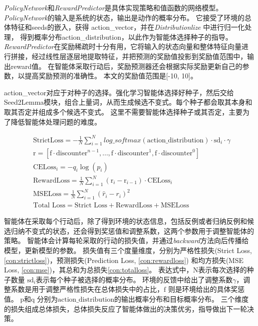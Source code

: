 \textit{PolicyNetwork}和\textit{RewardPredictor}是具体实现策略和值函数的网络模型。
\textit{PolicyNetwork}的输入是系统的状态，输出是动作的概率分布。
它接受了环境的总体特征和seeds的嵌入，获得 action\_vector，并在\textit{Distributionlize} 中进行归一化处理，
得到概率分布action\_distribution，以此作为智能体选择种子的指导。
\textit{RewardPredictor}在奖励稀疏时十分有用，它将输入的状态向量和整体特征向量进行拼接，经过线性层逐层地提取特征，并把预测的奖励值投影到奖励值范围中，输出reward值。
在智能体采取行动后，奖励预测器还会根据实际奖励更新自己的参数，以提高奖励预测的准确性。
本文的奖励值范围是[-10, 10]。

action\_vector对应于对种子的选择。强化学习智能体选择好种子，然后交给Seed2Lemma模块，组合上量词，从而生成候选不变式。每个种子都会取其本身和取其否定并组成多个候选不变式。
这里不需要智能体选择种子或其否定，主要为了降低智能体处理问题的难度。

\begin{align}
	&\text{StrictLoss} = - \frac{1}{N} \sum_{i=1}^{N} log\_softmax(\text{action\_distribution}) \cdot \text{sd}_i \cdot \gamma \label{con:strictloss} \\
	&\text{r} = \left[ \text{f} \cdot \text{discounter}^{n-1}, \ldots , \text{f} \cdot \text{discounter}^1, \text{f} \cdot \text{discounter}^{0} \right] \label{con:r}\\
	&\text{CELoss}_i = -q_{i} \log(p_{i}) \label{con:celoss} \\
	&\text{RewardLoss} = \frac{1}{N} \sum_{i=1}^{N} (\text{r}_{i} - \text{r}_{i-1}) \cdot \text{CELoss}_i \label{con:rewardloss} \\
	&\text{MSELoss} = \frac{1}{N} \sum_{i=1}^{N} (\hat{r}_i - r_i)^2\label{con:mse} \\
	&\text{Total Loss} = \text{Strict Loss}+\text{RewardLoss}+\text{MSELoss} \label{con:totalloss}
\end{align}

智能体在采取每个行动后，除了得到环境的状态信息，包括反例或者归纳反例和候选归纳不变式的状态，还会得到奖惩值和调整系数，这两个参数用于调整智能体的策略。
智能体会计算每轮采取的行动的损失值，并通过\textit{backward}方法向后传播给模型，更新模型的参数。
损失值有三个度量维度，分别为严格性损失(Strict Loss, \ref{con:strictloss})，预测损失(Prediction Loss, \ref{con:rewardloss})
和均方损失(MSE Loss, \ref{con:mse})，其总和为总损失\ref{con:totalloss}。
表达式中，$\text{N}$表示每次选择的种子数量 $\text{sd}_i$表示每个种子被选择的概率分布。
环境的反馈中给出了调整系数$\gamma$，调整系数是用于调整严格性损失在总体损失中的占比，$\text{f}$ 则是环境给出的具体奖惩值。
$\text{p}$和$\text{q}$ 分别为$\text{action\_distribution}$的输出概率分布和目标概率分布。
三个维度的损失组成总体损失，总体损失反应了智能体做出的决策优劣，指导做出下一轮决策。

